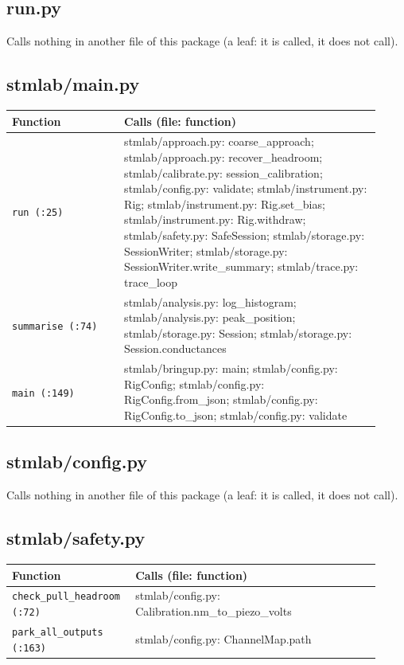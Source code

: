 \subsection{run.py}

Calls nothing in another file of this package (a leaf: it is called, it does not call).

\subsection{stmlab/main.py}

\small\setlength{\LTleft}{0pt}\setlength{\LTright}{\fill}
\begin{longtable}{@{}>{\raggedright\arraybackslash}p{0.280\linewidth}>{\raggedright\arraybackslash}p{0.640\linewidth}@{}}
\toprule
\textbf{Function} & \textbf{Calls (file: function)} \\
\midrule\endhead
\texttt{run (:25)} & stmlab/approach.py: coarse\_approach; stmlab/approach.py: recover\_headroom; stmlab/calibrate.py: session\_calibration; stmlab/config.py: validate; stmlab/instrument.py: Rig; stmlab/instrument.py: Rig.set\_bias; stmlab/instrument.py: Rig.withdraw; stmlab/safety.py: SafeSession; stmlab/storage.py: SessionWriter; stmlab/storage.py: SessionWriter.write\_summary; stmlab/trace.py: trace\_loop \\
\texttt{summarise (:74)} & stmlab/analysis.py: log\_histogram; stmlab/analysis.py: peak\_position; stmlab/storage.py: Session; stmlab/storage.py: Session.conductances \\
\texttt{main (:149)} & stmlab/bringup.py: main; stmlab/config.py: RigConfig; stmlab/config.py: RigConfig.from\_json; stmlab/config.py: RigConfig.to\_json; stmlab/config.py: validate \\
\bottomrule
\end{longtable}
\normalsize

\subsection{stmlab/config.py}

Calls nothing in another file of this package (a leaf: it is called, it does not call).

\subsection{stmlab/safety.py}

\small\setlength{\LTleft}{0pt}\setlength{\LTright}{\fill}
\begin{longtable}{@{}>{\raggedright\arraybackslash}p{0.280\linewidth}>{\raggedright\arraybackslash}p{0.640\linewidth}@{}}
\toprule
\textbf{Function} & \textbf{Calls (file: function)} \\
\midrule\endhead
\texttt{check\_\discretionary{}{}{}pull\_\discretionary{}{}{}headroom (:72)} & stmlab/config.py: Calibration.nm\_to\_piezo\_volts \\
\texttt{park\_\discretionary{}{}{}all\_\discretionary{}{}{}outputs (:163)} & stmlab/config.py: ChannelMap.path \\
\bottomrule
\end{longtable}
\normalsize

